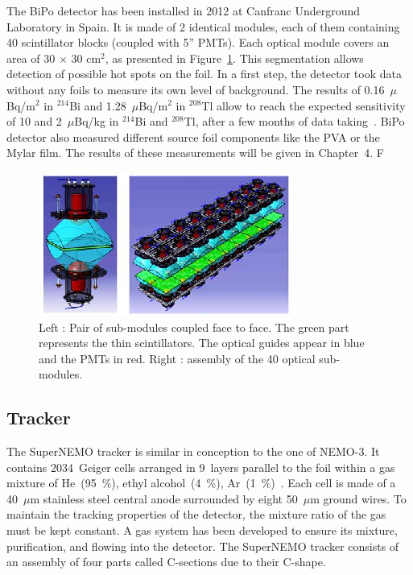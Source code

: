 \documentclass[main.tex]{subfiles}
\begin{document}
\bigskip


\NI The BiPo detector has been installed in 2012 at Canfranc Underground Laboratory in Spain. It is made of 2 identical modules, each of them containing 40 scintillator blocks (coupled with 5'' PMTs). Each optical module covers an area of 30 $\times$ 30 cm$^\text{2}$, as presented in Figure~\ref{BiPoDetector}. This segmentation allows detection of possible hot spots on the foil. In a first step, the detector took data without any foils to measure its own level of background. The results of 0.16~$\mu$Bq/m$^\text{2}$ in $^{\text{214}}$Bi and 1.28~$\mu$Bq/m$^\text{2}$ in $^{\text{208}}$Tl allow to reach the expected sensitivity of 10 and 2~$\mu$Bq/kg in $^{\text{214}}$Bi and $^{\text{208}}$Tl, after a few months of data taking~\cite{BiPoDetector}. BiPo detector also measured different source foil components like the PVA or the Mylar film. The results of these measurements will be given in Chapter~4. F%


\begin{figure}[h!]
\begin{center}
\includegraphics[scale=1.1]{pictures/Chap3/snemo_bipo.png}
\caption{Left : Pair of sub-modules coupled face to face. The green part represents the thin scintillators. The optical guides appear in blue and the PMTs in red. Right : assembly of the 40 optical sub-modules.}
\label{BiPoDetector}
\end{center}
\end{figure}



\FloatBarrier


\subsection{Tracker}


\NI The SuperNEMO tracker is similar in conception to the one of NEMO-3. It contains 2034~Geiger cells arranged in 9~layers parallel to the foil within a gas mixture of He~(95~\%), ethyl alcohol~(4~\%), Ar~(1~\%)~\cite{trackerSN}. Each cell is made of a 40~$\mu$m stainless steel central anode surrounded by eight 50~$\mu$m ground wires. To maintain the tracking properties of the detector, the mixture ratio of the gas must be kept constant. A gas system has been developed to ensure its mixture, purification, and flowing into the detector. The SuperNEMO tracker consists of an assembly of four parts called C-sections due to their C-shape. 
\end{document}
